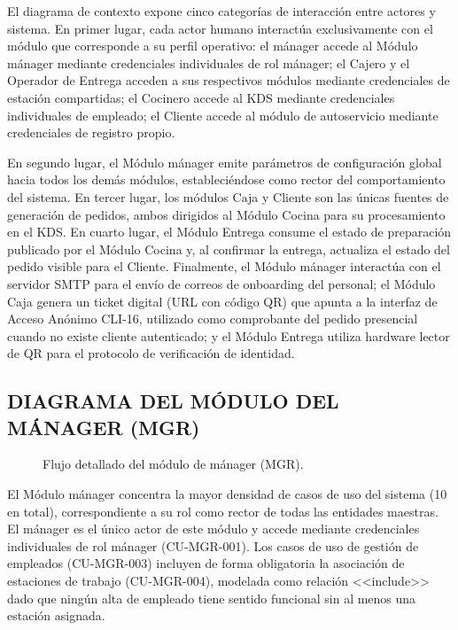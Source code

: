 El diagrama de contexto expone cinco categorías de interacción entre actores y sistema. En primer lugar, cada actor humano interactúa exclusivamente con el módulo que corresponde a su perfil operativo: el mánager accede al Módulo mánager mediante credenciales individuales de rol mánager; el Cajero y el Operador de Entrega acceden a sus respectivos módulos mediante credenciales de estación compartidas; el Cocinero accede al KDS mediante credenciales individuales de empleado; el Cliente accede al módulo de autoservicio mediante credenciales de registro propio. 

En segundo lugar, el Módulo mánager emite parámetros de configuración global hacia todos los demás módulos, estableciéndose como rector del comportamiento del sistema. En tercer lugar, los módulos Caja y Cliente son las únicas fuentes de generación de pedidos, ambos dirigidos al Módulo Cocina para su procesamiento en el KDS. En cuarto lugar, el Módulo Entrega consume el estado de preparación publicado por el Módulo Cocina y, al confirmar la entrega, actualiza el estado del pedido visible para el Cliente. Finalmente, el Módulo mánager interactúa con el servidor SMTP para el envío de correos de onboarding del personal; el Módulo Caja genera un ticket digital (URL con código QR) que apunta a la interfaz de Acceso Anónimo CLI-16, utilizado como comprobante del pedido presencial cuando no existe cliente autenticado; y el Módulo Entrega utiliza hardware lector de QR para el protocolo de verificación de identidad.

\subsection{DIAGRAMA DEL MÓDULO DEL MÁNAGER (MGR)}
\begin{figure}[H]
    \centering
    
    \caption{Flujo detallado del módulo de mánager (MGR).}
    \label{fig:casos_uso_manager}
\end{figure}

El Módulo mánager concentra la mayor densidad de casos de uso del sistema (10 en total), correspondiente a su rol como rector de todas las entidades maestras. El mánager es el único actor de este módulo y accede mediante credenciales individuales de rol mánager (CU-MGR-001). Los casos de uso de gestión de empleados (CU-MGR-003) incluyen de forma obligatoria la asociación de estaciones de trabajo (CU-MGR-004), modelada como relación <<include>> dado que ningún alta de empleado tiene sentido funcional sin al menos una estación asignada.  

